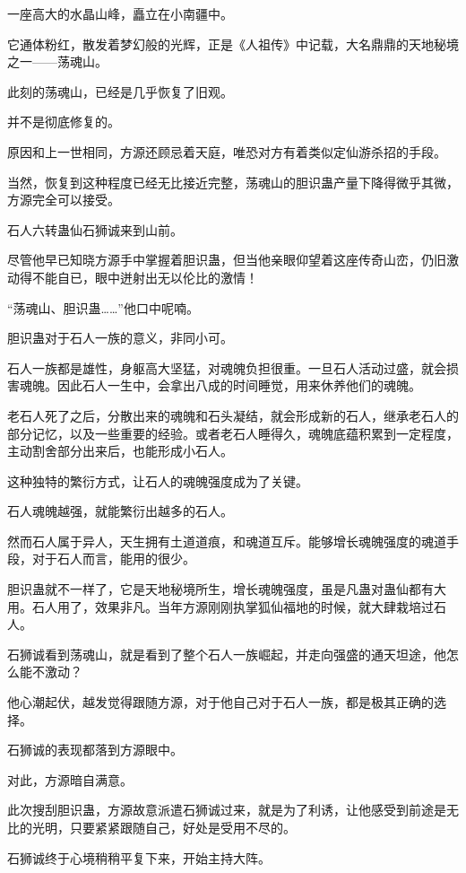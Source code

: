 
\begin{this_body}

一座高大的水晶山峰，矗立在小南疆中。

它通体粉红，散发着梦幻般的光辉，正是《人祖传》中记载，大名鼎鼎的天地秘境之一——荡魂山。

此刻的荡魂山，已经是几乎恢复了旧观。

并不是彻底修复的。

原因和上一世相同，方源还顾忌着天庭，唯恐对方有着类似定仙游杀招的手段。

当然，恢复到这种程度已经无比接近完整，荡魂山的胆识蛊产量下降得微乎其微，方源完全可以接受。

石人六转蛊仙石狮诚来到山前。

尽管他早已知晓方源手中掌握着胆识蛊，但当他亲眼仰望着这座传奇山峦，仍旧激动得不能自已，眼中迸射出无以伦比的激情！

“荡魂山、胆识蛊……”他口中呢喃。

胆识蛊对于石人一族的意义，非同小可。

石人一族都是雄性，身躯高大坚猛，对魂魄负担很重。一旦石人活动过盛，就会损害魂魄。因此石人一生中，会拿出八成的时间睡觉，用来休养他们的魂魄。

老石人死了之后，分散出来的魂魄和石头凝结，就会形成新的石人，继承老石人的部分记忆，以及一些重要的经验。或者老石人睡得久，魂魄底蕴积累到一定程度，主动割舍部分出来后，也能形成小石人。

这种独特的繁衍方式，让石人的魂魄强度成为了关键。

石人魂魄越强，就能繁衍出越多的石人。

然而石人属于异人，天生拥有土道道痕，和魂道互斥。能够增长魂魄强度的魂道手段，对于石人而言，能用的很少。

胆识蛊就不一样了，它是天地秘境所生，增长魂魄强度，虽是凡蛊对蛊仙都有大用。石人用了，效果非凡。当年方源刚刚执掌狐仙福地的时候，就大肆栽培过石人。

石狮诚看到荡魂山，就是看到了整个石人一族崛起，并走向强盛的通天坦途，他怎么能不激动？

他心潮起伏，越发觉得跟随方源，对于他自己对于石人一族，都是极其正确的选择。

石狮诚的表现都落到方源眼中。

对此，方源暗自满意。

此次搜刮胆识蛊，方源故意派遣石狮诚过来，就是为了利诱，让他感受到前途是无比的光明，只要紧紧跟随自己，好处是受用不尽的。

石狮诚终于心境稍稍平复下来，开始主持大阵。


\end{this_body}
